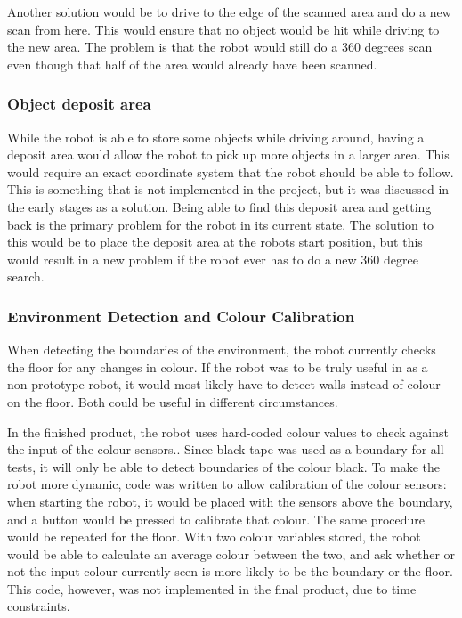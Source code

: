Another solution would be to drive to the edge of the scanned area and do a new scan from here. This would ensure that no object would be hit while driving to the new area. The problem is that the robot would still do a 360 degrees scan even though that half of the area would already have been scanned.

\subsubsection{Object deposit area}
While the robot is able to store some objects while driving around, having a deposit area would allow the robot to pick up more objects in a larger area. This would require an exact coordinate system that the robot should be able to follow. This is something that is not implemented in the project, but it was discussed in the early stages as a solution. Being able to find this deposit area and getting back is the primary problem for the robot in its current state. The solution to this would be to place the deposit area at the robots start position, but this would result in a new problem if the robot ever has to do a new 360 degree search. 

\subsubsection{Environment Detection and Colour Calibration}
When detecting the boundaries of the environment, the robot currently checks the floor for any changes in colour. If the robot was to be truly useful in as a non-prototype robot, it would most likely have to detect walls instead of colour on the floor. Both could be useful in different circumstances.

In the finished product, the robot uses hard-coded colour values to check against the input of the colour sensors.. Since black tape was used as a boundary for all tests, it will only be able to detect boundaries of the colour black. To make the robot more dynamic, code was written to allow calibration of the colour sensors: when starting the robot, it would be placed with the sensors above the boundary, and a button would be pressed to calibrate that colour. The same procedure would be repeated for the floor. With two colour variables stored, the robot would be able to calculate an average colour between the two, and ask whether or not the input colour currently seen is more likely to be the boundary or the floor. This code, however, was not implemented in the final product, due to time constraints.